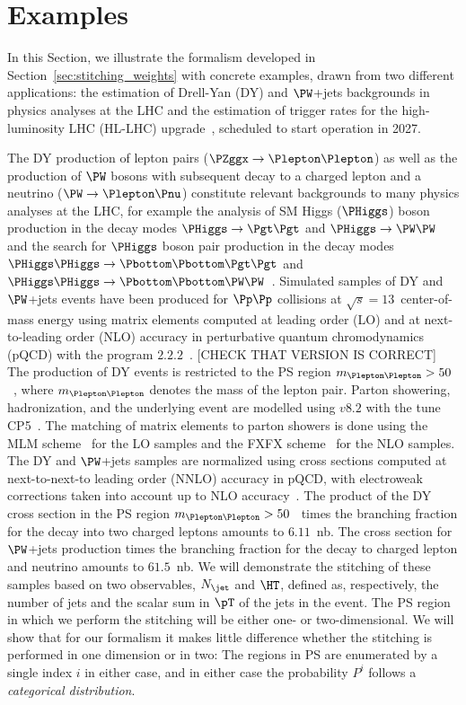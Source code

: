 \section{Examples}
\label{sec:examples}

In this Section, we illustrate the formalism developed in Section~\ref{sec:stitching_weights} with concrete examples,
drawn from two different applications: the estimation of Drell-Yan (DY) and $\PW$+jets backgrounds in physics analyses at the LHC
and the estimation of trigger rates for the high-luminosity LHC (HL-LHC) upgrade~\cite{TDR_Phase2_LHC},
scheduled to start operation in 2027.

The DY production of lepton pairs ($\PZggx \to \Plepton\Plepton$) as well as the production of $\PW$ bosons with subsequent decay to a charged lepton and a neutrino ($\PW \to \Plepton\Pnu$)
constitute relevant backgrounds to many physics analyses at the LHC,
for example the analysis of SM Higgs ($\PHiggs$) boson production in the decay modes $\PHiggs \to \Pgt\Pgt$ and $\PHiggs \to \PW\PW$
and the search for $\PHiggs$ boson pair production in the decay modes $\PHiggs\PHiggs \to \Pbottom\Pbottom\Pgt\Pgt$ and 
$\PHiggs\PHiggs \to \Pbottom\Pbottom\PW\PW$~\cite{ATLAS:2014aga,Aad:2015vsa,Aad:2019yxi,Aaboud:2018sfw,CMS-HIG-13-004,CMS-HIG-13-027,CMS-HIG-17-002,CMS-HIG-17-006}.
Simulated samples of DY and $\PW$+jets events have been produced for $\Pp\Pp$ collisions at $\sqrt{s}=13$~\TeV center-of-mass energy
using matrix elements computed at leading order (LO) and at next-to-leading order (NLO) accuracy in perturbative quantum chromodynamics (pQCD)
with the program \MGvATNLO $2.2.2$~\cite{Alwall:2014hca}. [CHECK THAT VERSION IS CORRECT]
The production of DY events is restricted to the PS region $m_{\Plepton\Plepton} > 50$~\GeV, where $m_{\Plepton\Plepton}$ denotes the mass of the lepton pair.
Parton showering, hadronization, and the underlying event are modelled using \PYTHIA $v8.2$ with the tune \textrm{CP5}~\cite{Sirunyan:2019dfx}.
The matching of matrix elements to parton showers is done using the \textrm{MLM} scheme~\cite{Alwall:2007fs} for the LO samples
and the \textrm{FXFX} scheme~\cite{Frederix:2012ps} for the NLO samples.
The DY and $\PW$+jets samples are normalized using cross sections computed at next-to-next-to leading order (NNLO) accuracy in pQCD,
with electroweak corrections taken into account up to NLO accuracy~\cite{Li:2012wna}.
The product of the DY cross section in the PS region $m_{\Plepton\Plepton} > 50$~\GeV
times the branching fraction for the decay into two charged leptons amounts to $6.11$~nb.
The cross section for $\PW$+jets production times the branching fraction for the decay to charged lepton and neutrino amounts to $61.5$~nb.
We will demonstrate the stitching of these samples based on two observables,
$N_{\jet}$ and $\HT$, defined as, respectively, the number of jets and the scalar sum in $\pT$ of the jets in the event.
The PS region in which we perform the stitching will be either one- or two-dimensional.
We will show that for our formalism
it makes little difference whether the stitching is performed in one dimension or in two:
The regions in PS are enumerated by a single index $i$ in either case,
and in either case the probability $P^{i}$ follows a {\em categorical distribution}.

